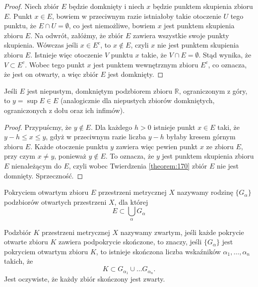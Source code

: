 \documentclass[leqno]{article}
\newcounter{lematcounter}
\begin{document}
\begin{justify}
\begin{proof}
    Niech zbiór $E$ będzie domknięty i niech $x$ będzie punktem skupienia zbioru $E$. Punkt $x \in E$, bowiem w przeciwnym razie istniałoby takie otoczenie $U$ tego punktu, że
    $E \cap U = \emptyset$, co jest niemożliwe, bowiem $x$ jest punktem skupienia zbioru $E$.
    Na odwrót, załóżmy, że zbiór $E$ zawiera wszystkie swoje punkty skupienia. Wówczas jeśli $x \in E^c$, to $x \notin E$, czyli 
    $x$ nie jest punktem skupienia zbioru $E$. Istnieje więc otoczenie $V$ punktu $x$ takie, że $V \cap E = \emptyset$. Stąd wynika, że $V \subset E^c$. 
    Wobec tego punkt $x$ jest punktem wewnętrznym zbioru $E^c$, co oznacza, że jest on otwarty, a więc zbiór $E$ jest domknięty.
\end{proof}

\setcounter{lematcounter}{5}

\begin{lemat}
    Jeśli $E$ jest niepustym, domkniętym podzbiorem zbioru $\mathbb{R}$, ograniczonym z góry, to $y = \sup E \in E$ (analogicznie dla niepustych zbiorów domkniętych, ograniczonych z dołu oraz ich infimów). 
\end{lemat}

\begin{proof}
    Przypuścmy, że $y \notin E$. Dla każdego $h > 0$ istnieje punkt $x \in E$ taki, że $y -h \leqslant x \leqslant y$, gdyż w przeciwnym
    razie liczba $y-h$ byłaby kresem górnym zbioru $E$.
    Każde otoczenie punktu $y$ zawiera więc pewien punkt $x$ ze zbioru $E$, przy czym $x \neq y$, ponieważ $y \notin E$.
    To oznacza, że $y$ jest punktem skupienia zbioru $E$ nienależącym do $E$, czyli wobec Twierdzenia \ref{theorem:170} zbiór $E$ nie jest domnięty.
    Sprzeczność.
\end{proof}

\begin{defn}
    Pokryciem otwartym zbioru $E$ przestrzeni metrycznej $X$ nazywamy rodzinę $\{G_\alpha\}$ podzbiorów otwartych przestrzeni $X$,
    dla której
    \[
        E \subset \bigcup_\alpha G_\alpha
    \]
\end{defn}

\begin{defn}
    Podzbiór $K$ przestrzeni metrycznej $X$ nazywamy zwartym, jeśli każde pokrycie otwarte zbioru $K$ zawiera podpokrycie skończone,
    to znaczy, jeśli $\{G_\alpha\}$ jest pokryciem otwartym zbioru $K$, to istnieje skończona liczba wskaźników $\alpha_1, \ldots, \alpha_n$ takich, że
    \[
        K \subset G_{\alpha_1} \cup \ldots G_{\alpha_n}.
    \]
    Jest oczywiste, że każdy zbiór skończony jest zwarty.
\end{defn}


\end{justify}
\end{document}
